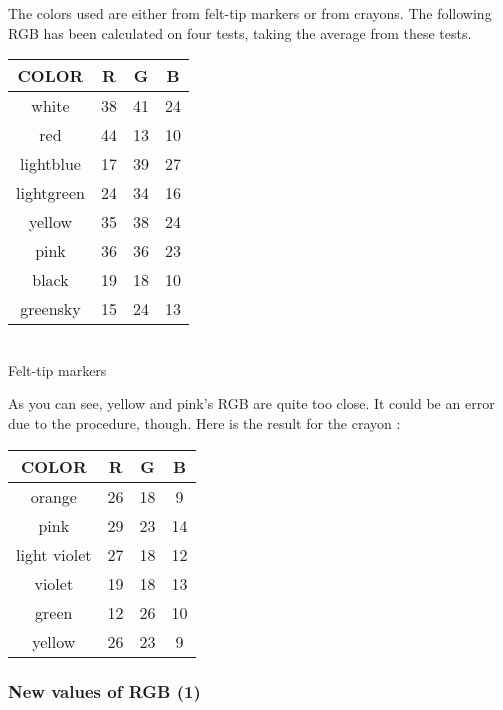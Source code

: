 \documentclass[a4paper, 12pt]{article}
\begin{document}
The colors used are either from felt-tip markers or from crayons. The following RGB has been calculated on four tests, taking the average from these tests.
\begin{center}
\begin{tabular}{|c|c|c|c|}
\hline 
COLOR & R & G & B \\ 
\hline 
white & 38 & 41 & 24 \\ 
\hline 
red & 44 & 13 & 10 \\ 
\hline 
lightblue & 17 & 39 & 27 \\ 
\hline 
lightgreen & 24 & 34 & 16 \\ 
\hline 
yellow & 35 & 38 & 24 \\ 
\hline 
pink & 36 & 36 & 23 \\ 
\hline 
black & 19 & 18 & 10 \\ 
\hline 
greensky & 15 & 24 & 13 \\ 
\hline 
\end{tabular}\\
\vspace{0.5cm}
Felt-tip markers
\end{center}
As you can see, yellow and pink's RGB are quite too close. It could be an error due to the procedure, though. Here is the result for the crayon :
\begin{center}
\begin{tabular}{|c|c|c|c|}
\hline 
COLOR & R & G & B \\ 
\hline 
orange & 26 & 18 & 9 \\ 
\hline 
pink & 29 & 23 & 14 \\ 
\hline 
light violet & 27 & 18 & 12 \\ 
\hline 
violet & 19 & 18 & 13 \\ 
\hline 
green & 12 & 26 & 10 \\ 
\hline 
yellow & 26 & 23 & 9 \\ 
\hline 
\end{tabular} 
\end{center}

\subsubsection{New values of RGB (1)}
\end{document}
